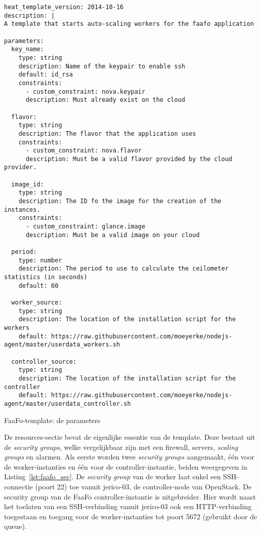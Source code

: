 \begin{code}
\begin{verbatim}
heat_template_version: 2014-10-16
description: |
A template that starts auto-scaling workers for the faafo application

parameters:
  key_name:
    type: string
    description: Name of the keypair to enable ssh
    default: id_rsa
    constraints:
      - custom_constraint: nova.keypair
      description: Must already exist on the cloud

  flavor:
    type: string
    description: The flavor that the application uses
    constraints:
      - custom_constraint: nova.flavor
      description: Must be a valid flavor provided by the cloud provider.

  image_id:
    type: string
    description: The ID fo the image for the creation of the instances.
    constraints:
      - custom_constraint: glance.image
      description: Must be a valid image on your cloud

  period:
    type: number
    description: The period to use to calculate the ceilometer statistics (in seconds)
    default: 60

  worker_source:
    type: string
    description: The location of the installation script for the workers
    default: https://raw.githubusercontent.com/moeyerke/nodejs-agent/master/userdata_workers.sh

  controller_source:
    type: string
    description: The location of the installation script for the controller
    default: https://raw.githubusercontent.com/moeyerke/nodejs-agent/master/userdata_controller.sh
\end{verbatim}
\caption{FaaFo-template: de parameters}
\label{lst:faafo_param}
\end{code}

De resources-sectie bevat de eigenlijke essentie van de template. Deze bestaat uit de \textit{security groups}, welke vergelijkbaar zijn met een firewall, servers, \textit{scaling groups} en alarmen. Als eerste worden twee \textit{security groups} aangemaakt, één voor de worker-instanties en één voor de controller-instantie, beiden weergegeven in Listing~\ref{lst:faafo_sec}. De \textit{security group} van de worker laat enkel een SSH-connectie (poort 22) toe vanuit jerico-03, de controller-node van OpenStack. De security group van de FaaFo controller-instantie is uitgebreider. Hier wordt naast het toelaten van een SSH-verbinding vanuit jerico-03 ook een HTTP-verbinding toegestaan en toegang voor de worker-instanties tot poort 5672 (gebruikt door de queue).

